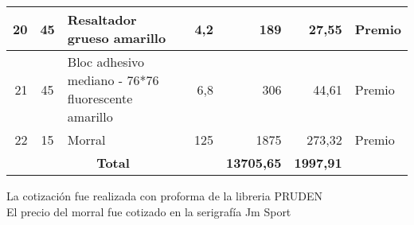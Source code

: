 \documentclass{article}
\begin{document}
\begin{table}[htbp]
{\begin{tabular}{|cccc|r|r|r}
    \midrule
    \multicolumn{1}{|r|}{20} & \multicolumn{1}{c|}{45} & \multicolumn{1}{l|}{Resaltador grueso amarillo} & \multicolumn{1}{r|}{4,2} & 189   & 27,55 & \multicolumn{1}{l|}{Premio} \\
    \midrule
    \multicolumn{1}{|r|}{21} & \multicolumn{1}{c|}{45} & \multicolumn{1}{l|}{Bloc adhesivo mediano - 76*76 fluorescente amarillo} & \multicolumn{1}{r|}{6,8} & 306   & 44,61 & \multicolumn{1}{l|}{Premio} \\
    \midrule
    \multicolumn{1}{|r|}{22} & \multicolumn{1}{c|}{15} & \multicolumn{1}{l|}{Morral} & \multicolumn{1}{r|}{125} & 1875  & 273,32 & \multicolumn{1}{l|}{Premio} \\
    \midrule
    \multicolumn{4}{|c|}{\textbf{Total}} & \textbf{13705,65} & \textbf{1997,91} &  \\
\cmidrule{1-6}    \end{tabular}}%
  \label{tab:addlabel}%
\end{table}%


La cotización fue realizada con proforma de la libreria PRUDEN \\
El precio del morral fue cotizado en la serigrafía Jm Sport 









%


%
\end{document}
